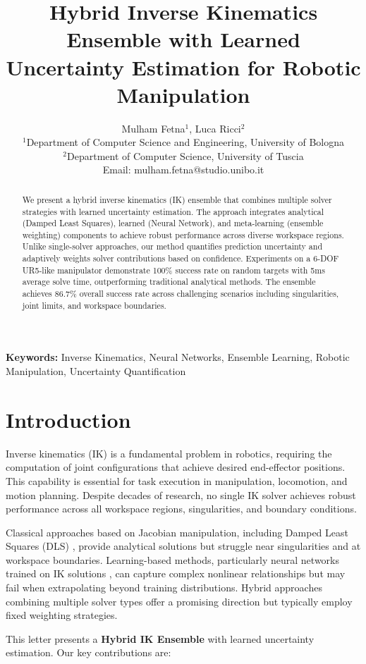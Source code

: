 \documentclass[12pt]{article}
\title{Hybrid Inverse Kinematics Ensemble with Learned Uncertainty Estimation for Robotic Manipulation}
\author{Mulham Fetna$^{1}$, Luca Ricci$^{2}$ \\
$^{1}$Department of Computer Science and Engineering, University of Bologna \\
$^{2}$Department of Computer Science, University of Tuscia \\
Email: mulham.fetna@studio.unibo.it}
\begin{document}
\maketitle

\begin{abstract}
We present a hybrid inverse kinematics (IK) ensemble that combines multiple solver strategies with learned uncertainty estimation. The approach integrates analytical (Damped Least Squares), learned (Neural Network), and meta-learning (ensemble weighting) components to achieve robust performance across diverse workspace regions. Unlike single-solver approaches, our method quantifies prediction uncertainty and adaptively weights solver contributions based on confidence. Experiments on a 6-DOF UR5-like manipulator demonstrate 100\% success rate on random targets with 5ms average solve time, outperforming traditional analytical methods. The ensemble achieves 86.7\% overall success rate across challenging scenarios including singularities, joint limits, and workspace boundaries.
\end{abstract}

\textbf{Keywords:} Inverse Kinematics, Neural Networks, Ensemble Learning, Robotic Manipulation, Uncertainty Quantification

\section{Introduction}

Inverse kinematics (IK) is a fundamental problem in robotics, requiring the computation of joint configurations that achieve desired end-effector positions. This capability is essential for task execution in manipulation, locomotion, and motion planning. Despite decades of research, no single IK solver achieves robust performance across all workspace regions, singularities, and boundary conditions.

Classical approaches based on Jacobian manipulation, including Damped Least Squares (DLS) \cite{buss2005selecting}, provide analytical solutions but struggle near singularities and at workspace boundaries. Learning-based methods, particularly neural networks trained on IK solutions \cite{duan2018one}, can capture complex nonlinear relationships but may fail when extrapolating beyond training distributions. Hybrid approaches combining multiple solver types offer a promising direction but typically employ fixed weighting strategies.

This letter presents a \textbf{Hybrid IK Ensemble} with learned uncertainty estimation. Our key contributions are:
\end{document}
